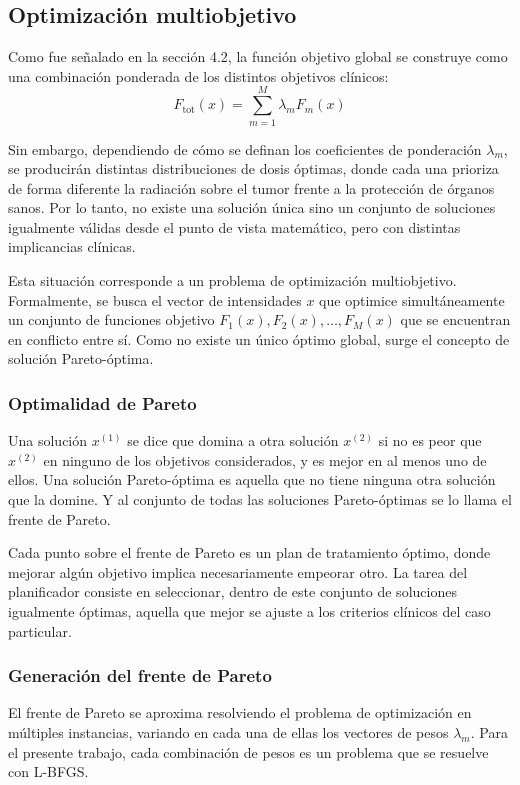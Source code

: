 \subsection{Optimización multiobjetivo}

Como fue señalado en la sección 4.2, la función objetivo global se construye como una combinación ponderada de los distintos objetivos clínicos:
\[
F_{\text{tot}}(x)
=
\sum_{m=1}^{M}
\lambda_m F_m(x)
\]

Sin embargo, dependiendo de cómo se definan los coeficientes de ponderación \(\lambda_m\), se producirán distintas distribuciones de dosis óptimas, donde cada una prioriza de forma diferente la radiación sobre el tumor frente a la protección de órganos sanos. Por lo tanto, no existe una solución única sino un conjunto de soluciones igualmente válidas desde el punto de vista matemático, pero con distintas implicancias clínicas.

Esta situación corresponde a un problema de optimización multiobjetivo. Formalmente, se busca el vector de intensidades \(x\) que optimice simultáneamente un conjunto de funciones objetivo \(F_1(x), F_2(x), \ldots, F_M(x)\) que se encuentran en conflicto entre sí. Como no existe un único óptimo global, surge el concepto de solución Pareto-óptima.

\subsubsection*{Optimalidad de Pareto}

Una solución \(x^{(1)}\) se dice que domina a otra solución \(x^{(2)}\) si no es peor que \(x^{(2)}\) en ninguno de los objetivos considerados, y es mejor en al menos uno de ellos. Una solución Pareto-óptima es aquella que no tiene ninguna otra solución que la domine. Y al conjunto de todas las soluciones Pareto-óptimas se lo llama el frente de Pareto.

Cada punto sobre el frente de Pareto es un plan de tratamiento óptimo, donde mejorar algún objetivo implica necesariamente empeorar otro. La tarea del planificador consiste en seleccionar, dentro de este conjunto de soluciones igualmente óptimas, aquella que mejor se ajuste a los criterios clínicos del caso particular.

\subsubsection*{Generación del frente de Pareto}

El frente de Pareto se aproxima resolviendo el problema de optimización en múltiples instancias, variando en cada una de ellas los vectores de pesos \(\lambda_m\). Para el presente trabajo, cada combinación de pesos es un problema que se resuelve con L-BFGS.

